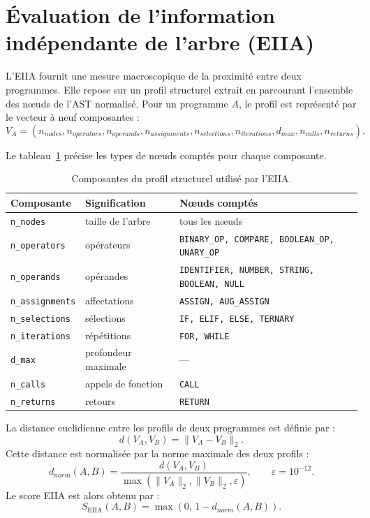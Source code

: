 \documentclass[12pt,a4paper,oneside]{report}
\begin{document}
\section{Évaluation de l'information indépendante de l'arbre (EIIA)}

L'EIIA fournit une mesure macroscopique de la proximité entre deux programmes.
Elle repose sur un profil structurel extrait en parcourant l'ensemble des
nœuds de l'AST normalisé. Pour un programme $A$, le profil est représenté par
le vecteur à neuf composantes :
\begin{equation}
V_A = (n_{nodes}, n_{operators}, n_{operands}, n_{assignments},
       n_{selections}, n_{iterations}, d_{max}, n_{calls}, n_{returns}).
\end{equation}

Le tableau~\ref{tab:eiia} précise les types de nœuds comptés pour chaque
composante.

\begin{table}[htbp]
\centering
\small
\begin{tabular}{lll}
\toprule
\textbf{Composante} & \textbf{Signification} & \textbf{Nœuds comptés} \\
\midrule
\texttt{n\_nodes} & taille de l'arbre & tous les nœuds \\
\texttt{n\_operators} & opérateurs & \texttt{BINARY\_OP, COMPARE, BOOLEAN\_OP, UNARY\_OP} \\
\texttt{n\_operands} & opérandes & \texttt{IDENTIFIER, NUMBER, STRING, BOOLEAN, NULL} \\
\texttt{n\_assignments} & affectations & \texttt{ASSIGN, AUG\_ASSIGN} \\
\texttt{n\_selections} & sélections & \texttt{IF, ELIF, ELSE, TERNARY} \\
\texttt{n\_iterations} & répétitions & \texttt{FOR, WHILE} \\
\texttt{d\_max} & profondeur maximale & --- \\
\texttt{n\_calls} & appels de fonction & \texttt{CALL} \\
\texttt{n\_returns} & retours & \texttt{RETURN} \\
\bottomrule
\end{tabular}
\caption{Composantes du profil structurel utilisé par l'EIIA.}
\label{tab:eiia}
\end{table}

La distance euclidienne entre les profils de deux programmes est définie par :
\begin{equation}
d(V_A,V_B) = \lVert V_A - V_B \rVert_2 .
\end{equation}
Cette distance est normalisée par la norme maximale des deux profils :
\begin{equation}
d_{norm}(A,B) = \frac{d(V_A,V_B)}{\max\left(\lVert V_A\rVert_2,
\lVert V_B\rVert_2, \varepsilon\right)}, \qquad \varepsilon = 10^{-12}.
\end{equation}
Le score EIIA est alors obtenu par :
\begin{equation}
S_{\mathrm{EIIA}}(A,B) = \max\left(0,\, 1 - d_{norm}(A,B)\right).
\end{equation}
\end{document}
